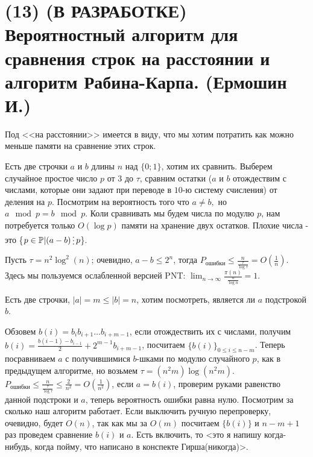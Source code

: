 \newcommand{\divisible}{\mathop{\raisebox{-2pt}{\vdots}}}
\section{(13) (В РАЗРАБОТКЕ) Вероятностный алгоритм для сравнения строк на расстоянии и алгоритм Рабина-Карпа. (Ермошин И.)}


Под <<на расстоянии>> имеется в виду, что мы хотим потратить как можно меньше памяти на сравнение этих строк.

Есть две строчки $a$ и $b$ длины $n$ над $\{0;1\}$, хотим их сравнить. Выберем случайное простое число $p$ от $3$ до $\tau$, сравним остатки ($a$ и $b$ отождествим с числами, которые они задают при переводе в $10$-ю систему счисления) от деления на $p$. Посмотрим на вероятность того что $a\neq b,$ но $a\mod{p}=b\mod{p}$. Коли сравнивать мы будем числа по модулю $p$, нам потребуется только $O(\log p)$ памяти на хранение двух остатков.
Плохие числа - это \{$p\in\mathbb{P} | (a-b)\divisible p$\}.


Пусть $\tau=n^2 \log^2(n)$; очевидно, $a-b\le 2^n$, тогда $P_{\text{ошибки}}\le\frac{n}{\frac{\tau}{\log\tau}}=O\left(\frac{1}{n}\right)$. Здесь мы пользуемся ослабленной версией PNT: $\lim_{n\to\infty} \frac{\pi(n)}{\frac{n}{\log n}}=1$.

Есть две строчки, $|a|=m\le|b|=n$, хотим посмотреть, является ли $a$ подстрокой $b$.

Обзовем $b(i)=b_i b_{i+1}\ldots b_{i+m-1}$, если отождествить их с числами, получим $b(i)=\frac{b(i-1)-b_{i-1}}{2}+2^{m-1} b_{i+m-1}$, посчитаем $\{b(i)\}_{0\le i\le n-m}$. Теперь посравниваем $a$ с получившимися $b$-шками по модулю случайного $p$, как в предыдущем алгоритме, но возьмем $\tau=(n^2m)\log(n^2m)$. $P_{\text{ошибки}}\le\frac{n}{\frac{\tau}{\log\tau}}\le\frac{2}{n^2}=O(\frac{1}{n^2})$, если $a=b(i)$, проверим руками равенство данной подстроки и $a$, теперь вероятность ошибки равна нулю. Посмотрим за сколько наш алгоритм работает. Если выключить ручную перепроверку, очевидно, будет $O(n)$, так как мы за $O(m)$ посчитаем $\{b(i)\}$ и $n-m+1$ раз проведем сравнение $b(i)$ и $a$. Есть включить, то <это я напишу когда-нибудь, когда пойму, что написано в конспекте Гирша(никогда)>.
